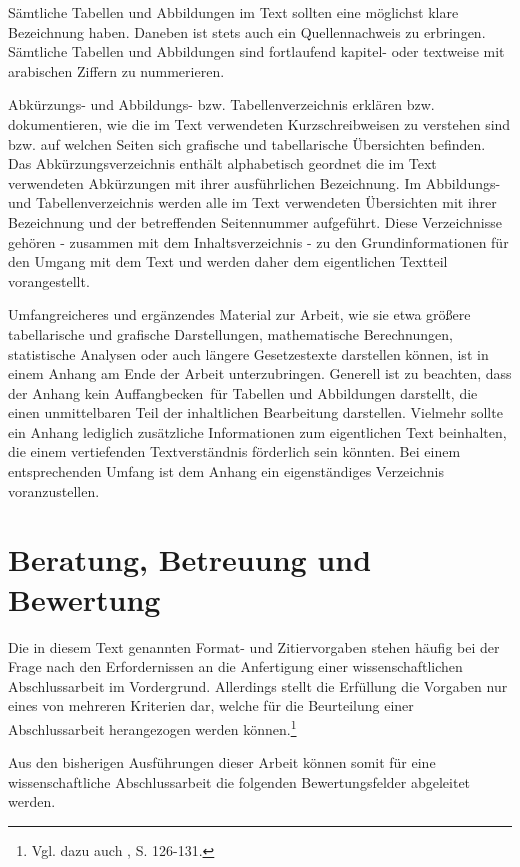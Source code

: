 \documentclass[a4paper, 12pt]{article}
\begin{document}
S\"{a}mtliche Tabellen und Abbildungen im Text sollten eine m\"{o}glichst klare Bezeichnung
haben. Daneben ist stets auch ein Quellennachweis zu erbringen. S\"{a}mtliche Tabellen
und Abbildungen sind fortlaufend kapitel- oder textweise mit arabischen Ziffern zu
nummerieren.

Abk\"{u}rzungs- und Abbildungs- bzw. Tabellenverzeichnis erkl\"{a}ren bzw. dokumentieren,
wie die im Text verwendeten Kurzschreibweisen zu verstehen sind bzw. auf welchen
Seiten sich grafische und tabellarische \"{U}bersichten befinden. Das
Abk\"{u}rzungsverzeichnis enth\"{a}lt alphabetisch geordnet die im Text verwendeten
Abk\"{u}rzungen mit ihrer ausf\"{u}hrlichen Bezeichnung. Im Abbildungs- und
Tabellenverzeichnis werden alle im Text verwendeten \"{U}bersichten mit ihrer
Bezeichnung und der betreffenden Seitennummer aufgef\"{u}hrt. Diese Verzeichnisse
geh\"{o}ren - zusammen mit dem Inhaltsverzeichnis - zu den Grundinformationen f\"{u}r den
Umgang mit dem Text und werden daher dem eigentlichen Textteil vorangestellt.

Umfangreicheres und erg\"{a}nzendes Material zur Arbeit, wie sie etwa gr\"{o}\ss ere
tabellarische und grafische Darstellungen, mathematische Berechnungen, statistische
Analysen oder auch l\"{a}ngere Gesetzestexte darstellen k\"{o}nnen, ist in einem Anhang am
Ende der Arbeit unterzubringen. Generell ist zu beachten, dass der Anhang kein \glqq
Auffangbecken\grqq\ f\"{u}r Tabellen und Abbildungen darstellt, die einen unmittelbaren
Teil der inhaltlichen Bearbeitung darstellen. Vielmehr sollte ein Anhang lediglich
zus\"{a}tzliche Informationen zum eigentlichen Text beinhalten, die einem vertiefenden
Textverst\"{a}ndnis f\"{o}rderlich sein k\"{o}nnten. Bei einem entsprechenden Umfang ist dem
Anhang ein eigenst\"{a}ndiges Verzeichnis voranzustellen.

\section{Beratung, Betreuung und Bewertung}\label{Beratung}

Die in diesem Text genannten Format- und Zitiervorgaben stehen h\"{a}ufig bei der Frage
nach den Erfordernissen an die Anfertigung einer wissenschaftlichen Abschlussarbeit
im Vordergrund. Allerdings stellt die Erf\"{u}llung die Vorgaben nur eines von mehreren
Kriterien dar, welche f\"{u}r die Beurteilung einer Abschlussarbeit herangezogen werden
k\"{o}nnen.\footnote{Vgl. dazu auch \cite{spd2004}, S. 126-131.}

Aus den bisherigen Ausf\"{u}hrungen dieser Arbeit k\"{o}nnen somit f\"{u}r eine
wissenschaftliche Abschlussarbeit die folgenden Bewertungsfelder abgeleitet werden.
\end{document}
